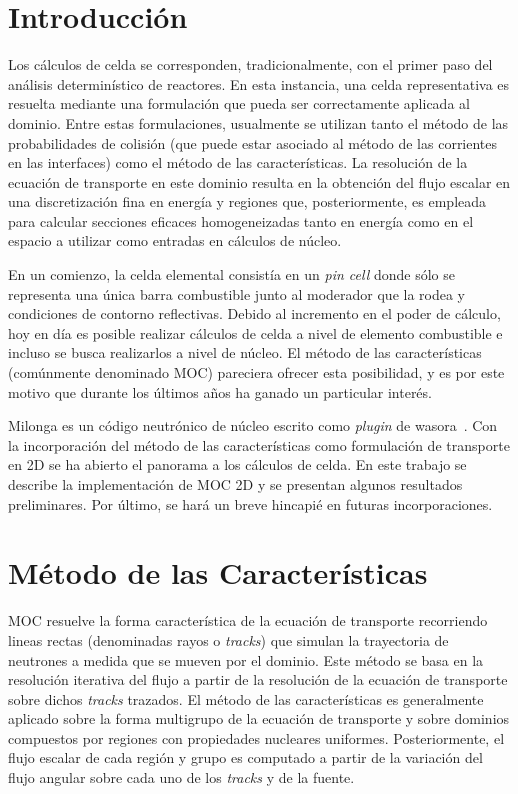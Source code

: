 \documentclass[11pt]{article}
\begin{document}
\addtolength{\textheight}{-2cm}

\pagebreak


\tableofcontents
\pagebreak


\section{Introducción}

Los cálculos de celda se corresponden, tradicionalmente, con el primer paso del análisis determinístico de reactores. En esta instancia, una celda representativa es resuelta mediante una formulación que pueda ser correctamente aplicada al dominio. Entre estas formulaciones, usualmente se utilizan tanto el método de las probabilidades de colisión (que puede estar asociado al método de las corrientes en las interfaces) como el método de las características. La resolución de la ecuación de transporte en este dominio resulta en la obtención del flujo escalar en una discretización fina en energía y regiones que, posteriormente, es empleada para calcular secciones eficaces homogeneizadas tanto en energía como en el espacio a utilizar como entradas en cálculos de núcleo.

En un comienzo, la celda elemental consistía en un \emph{pin cell} donde sólo se representa una única barra combustible junto al moderador que la rodea y condiciones de contorno reflectivas. Debido al incremento en el poder de cálculo, hoy en día es posible realizar cálculos de celda a nivel de elemento combustible e incluso se busca realizarlos a nivel de núcleo. El método de las características (comúnmente denominado MOC) pareciera ofrecer esta posibilidad, y es por este motivo que durante los últimos años ha ganado un particular interés. 

Milonga es un código neutrónico de núcleo escrito como \emph{plugin} de wasora~\cite{wasora}. Con la incorporación del método de las características como formulación de transporte en 2D se ha abierto el panorama a los cálculos de celda. En este trabajo se describe la implementación de MOC 2D y se presentan algunos resultados preliminares. Por último, se hará un breve hincapié en futuras incorporaciones.


\section{Método de las Características}

MOC resuelve la forma característica de la ecuación de transporte recorriendo lineas rectas (denominadas rayos o \emph{tracks}) que simulan la trayectoria de neutrones a medida que se mueven por el dominio. Este método se basa en la resolución iterativa del flujo a partir de la resolución de la ecuación de transporte sobre dichos \emph{tracks} trazados. El método de las características es generalmente aplicado sobre la forma multigrupo de la ecuación de transporte y sobre dominios compuestos por regiones con propiedades nucleares uniformes. Posteriormente, el flujo escalar de cada región y grupo es computado a partir de la variación del flujo angular sobre cada uno de los \emph{tracks} y de la fuente. 
\end{document}
